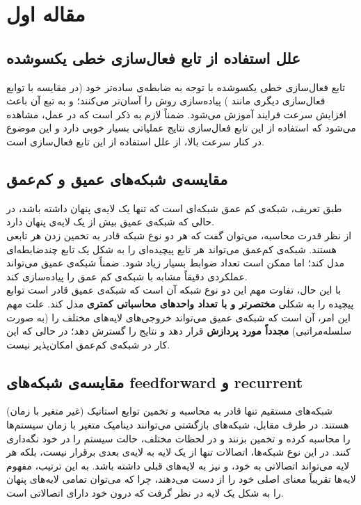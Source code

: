 \documentclass[a4paper]{article}
\begin{document}
	\large
	\section{مقاله اول}
	\subsection{علل استفاده از تابع فعال‌سازی خطی یکسوشده}
	تابع فعال‌سازی خطی یکسوشده 
	با توجه به ضابطه‌ی ساده‌تر خود (در مقایسه با توابع فعال‌سازی دیگری مانند ) پیاده‌سازی روش 
	را آسان‌تر می‌کنند؛ و به تبع آن باعث افزایش سرعت فرایند آموزش 
	می‌شود. ضمناً لازم به ذکر است که در عمل، مشاهده می‌شود که استفاده از این تابع فعال‌سازی نتایج عملیاتی بسیار خوبی دارد و این موضوع در کنار سرعت بالا، از علل استفاده از این تابع فعال‌سازی است.\\

	
	\subsection{مقایسه‌ی شبکه‌های عمیق و کم‌عمق}
	طبق تعریف، شبکه‌ی کم عمق شبکه‌ای است که تنها یک لایه‌ی پنهان داشته باشد، در حالی که شبکه‌ی عمیق بیش از یک لایه‌ی پنهان دارد. \\
	
	از نظر قدرت محاسبه، می‌توان گفت که هر دو نوع شبکه قادر به تخمین زدن هر تابعی هستند. شبکه‌ی کم‌عمق می‌تواند هر تابع پیچیده‌ای را به شکل یک تابع چندضابطه‌ای مدل کند؛ اما ممکن است تعداد ضوابط بسیار زیاد شود. ضمناً شبکه‌ی عمیق می‌تواند عملکردی دقیقاً مشابه با شبکه‌ی کم عمق را پیاده‌سازی کند.\\
	
	با این حال، تفاوت مهم این دو نوع شبکه آن است که شبکه‌ی عمیق قادر است توابع پیچیده را به شکلی \textbf{مختصرتر و با تعداد واحدهای محاسباتی کمتری }مدل کند. علت مهم این امر، آن است که شبکه‌ی عمیق می‌تواند خروجی‌های لایه‌های مختلف را (به صورت سلسله‌مراتبی) \textbf{مجدداً مورد پردازش }قرار دهد و نتایج را گسترش دهد؛ در حالی که این کار در شبکه‌ی کم‌عمق امکان‌پذیر نیست.
	
	\subsection{مقایسه‌ی شبکه‌های {feedforward} و {recurrent}}
	شبکه‌های مستقیم  تنها قادر به محاسبه و تخمین توابع استاتیک (غیر متغیر با زمان) هستند. در طرف مقابل، شبکه‌های بازگشتی  می‌توانند دینامیک متغیر با زمان سیستم‌ها را محاسبه کرده و تخمین بزنند و در لحظات مختلف، حالت سیستم را در خود نگه‌داری کنند. در این نوع شبکه‌ها، اتصالات تنها از یک لایه به لایه‌ی بعدی برقرار نیست، بلکه هر لایه می‌تواند اتصالاتی به خود، و نیز به لایه‌های قبلی داشته باشد. به این ترتیب، مفهوم لایه‌ها تقریباً معنای اصلی خود را از دست می‌دهند، چرا که می‌توان تمامی لایه‌های پنهان را به شکل یک لایه در نظر گرفت که درون خود دارای اتصالاتی است.\\
	
\end{document}
